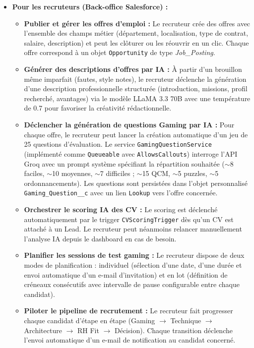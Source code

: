 \begin{itemize}
\item \textbf{Pour les recruteurs (Back-office Salesforce) :}
\begin{itemize}
    \item \textbf{Publier et gérer les offres d'emploi :} Le recruteur crée des offres avec l'ensemble des champs métier (département, localisation, type de contrat, salaire, description) et peut les clôturer ou les réouvrir en un clic. Chaque offre correspond à un objet \texttt{Opportunity} de type \textit{Job\_Posting}.
    \item \textbf{Générer des descriptions d'offres par IA :} À partir d'un brouillon même imparfait (fautes, style notes), le recruteur déclenche la génération d'une description professionnelle structurée (introduction, missions, profil recherché, avantages) via le modèle LLaMA 3.3 70B avec une température de 0.7 pour favoriser la créativité rédactionnelle.
    \item \textbf{Déclencher la génération de questions Gaming par IA :} Pour chaque offre, le recruteur peut lancer la création automatique d'un jeu de 25 questions d'évaluation. Le service \texttt{GamingQuestionService} (implémenté comme \texttt{Queueable} avec \texttt{AllowsCallouts}) interroge l'API Groq avec un prompt système spécifiant la répartition souhaitée ($\sim$8 faciles, $\sim$10 moyennes, $\sim$7 difficiles ; $\sim$15 QCM, $\sim$5 puzzles, $\sim$5 ordonnancements). Les questions sont persistées dans l'objet personnalisé \texttt{Gaming\_Question\_\_c} avec un lien \texttt{Lookup} vers l'offre concernée.
    \item \textbf{Orchestrer le scoring IA des CV :} Le scoring est déclenché automatiquement par le trigger \texttt{CVScoringTrigger} dès qu'un CV est attaché à un Lead. Le recruteur peut néanmoins relancer manuellement l'analyse IA depuis le dashboard en cas de besoin.
    \item \textbf{Planifier les sessions de test gaming :} Le recruteur dispose de deux modes de planification : individuel (sélection d'une date, d'une durée et envoi automatique d'un e-mail d'invitation) et en lot (définition de créneaux consécutifs avec intervalle de pause configurable entre chaque candidat).
    \item \textbf{Piloter le pipeline de recrutement :} Le recruteur fait progresser chaque candidat d'étape en étape (Gaming $\rightarrow$ Technique $\rightarrow$ Architecture $\rightarrow$ RH Fit $\rightarrow$ Décision). Chaque transition déclenche l'envoi automatique d'un e-mail de notification au candidat concerné.
\end{itemize}


\end{itemize}
